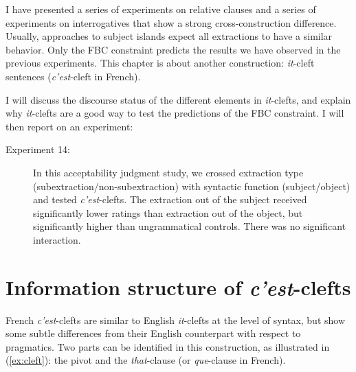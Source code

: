 I have presented a series of experiments on relative clauses and a series of experiments on interrogatives that show a strong cross-construction difference. Usually, approaches to subject islands expect all extractions to have a similar behavior. Only the FBC constraint predicts the results we have observed in the previous experiments. This chapter is about another construction: \emph{it}-cleft sentences (\emph{c'est}-cleft in French).

I will discuss the discourse status of the different elements in \emph{it}-clefts, and explain why \emph{it}-clefts are a good way to test the predictions of the FBC constraint. I will then report on an experiment:

\begin{description}

\item[Experiment 14:] In this acceptability judgment study, we crossed extraction type (subextraction\slash non-subextraction) with syntactic function (subject\slash object) and tested \emph{c'est}-clefts. The extraction out of the subject received significantly lower ratings than extraction out of the object, but significantly higher than ungrammatical controls. There was no significant interaction.

\end{description}

\section{Information structure of \emph{c'est}-clefts}
\label{ch:is-clefts}


French \emph{c'est}-clefts are similar to English \emph{it}-clefts at the level of syntax, but show some subtle differences from their English counterpart with respect to pragmatics. Two parts can be identified in this construction, as illustrated in (\ref{ex:cleft}): the pivot and the \emph{that}-clause (or \emph{que}-clause in French). 

\eal\label{ex:cleft}
\zl 


